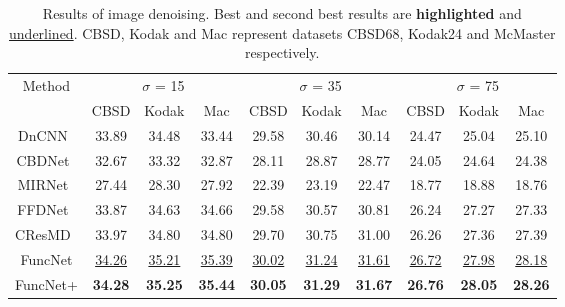 \documentclass{article}
\begin{document}
{\begin{table}
\caption{Results of image denoising. Best and second best results are \textbf{highlighted} and \underline{underlined}. CBSD, Kodak and Mac represent datasets CBSD68, Kodak24 and McMaster respectively.}
\label{tab:table3}
\begin{adjustbox}{center}
\begin{tabular}{|c|c|c|c|c|c|c|c|c|c|}
\hline
\multirow{2}{*}{Method} & \multicolumn{3}{c|}{$\sigma$ = 15} & \multicolumn{3}{c|}{$\sigma$ = 35} & \multicolumn{3}{c|}{$\sigma$ = 75} \\ \cline{2-10}
& CBSD & Kodak & Mac & CBSD & Kodak & Mac & CBSD & Kodak & Mac \\ \hline
DnCNN~\cite{zhang2017beyond} & 33.89 & 34.48 & 33.44 & 29.58 & 30.46 & 30.14 & 24.47 & 25.04 & 25.10 \\
CBDNet~\cite{guo2019toward} & 32.67 & 33.32 & 32.87 & 28.11 & 28.87 & 28.77 & 24.05 & 24.64 & 24.38 \\
MIRNet~\cite{zamir2020learning} & 27.44 & 28.30 & 27.92 & 22.39 & 23.19 & 22.47 & 18.77 & 18.88 & 18.76 \\
FFDNet~\cite{zhang2018ffdnet} & 33.87 & 34.63 & 34.66 & 29.58 & 30.57 & 30.81 & 26.24 & 27.27 & 27.33 \\
CResMD~\cite{he2020interactive} & 33.97 & 34.80 & 34.80 & 29.70 & 30.75 & 31.00 & 26.26 & 27.36 & 27.39 \\
FuncNet & \underline{34.26} & \underline{35.21} & \underline{35.39} & \underline{30.02} & \underline{31.24} & \underline{31.61} & \underline{26.72} & \underline{27.98} & \underline{28.18} \\
FuncNet+ & \textbf{34.28} & \textbf{35.25} & \textbf{35.44} & \textbf{30.05} & \textbf{31.29} & \textbf{31.67} & \textbf{26.76} & \textbf{28.05} & \textbf{28.26} \\ \hline
\end{tabular}
\end{adjustbox}
\bigskip


\end{table}}
\end{document}
